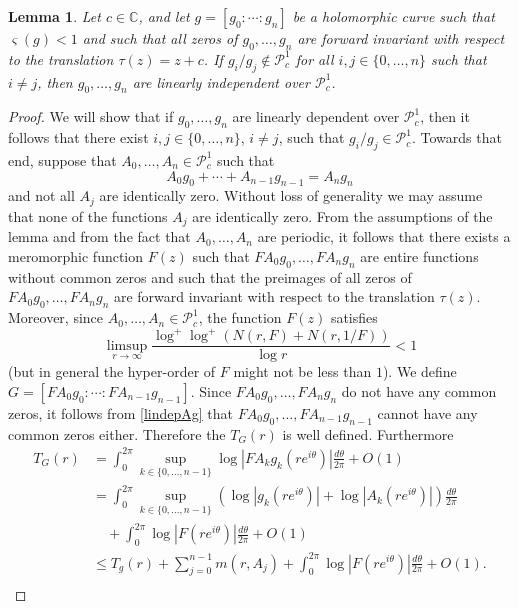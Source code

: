 \documentclass{amsart}
\newcommand{\C}{\mathbb{C}}
\newtheorem{lemma}[theorem]{Lemma}
\theoremstyle{definition}
\numberwithin{equation}{section}
\numberwithin{theorem}{section}
\begin{document}
\begin{lemma}\label{linindepP}
Let $c\in\C$, and let $g=[g_0:\cdots:g_n]$ be a holomorphic curve such that $\varsigma(g)<1$ and such that all zeros of $g_0,\ldots,g_n$ are forward invariant with respect to the translation $\tau(z)=z+c$. If $g_i/g_j\not\in \mathcal{P}^1_c$ for all $i,j\in\{0,\ldots,n\}$ such that $i\not=j$, then $g_0,\ldots,g_n$ are linearly independent over $\mathcal{P}^1_c$.
\end{lemma}

\begin{proof}
We will show that if $g_0,\ldots,g_n$ are linearly dependent over $\mathcal{P}^1_c$, then it follows that there exist $i,j\in\{0,\ldots,n\}$, $i\not=j$, such that $g_i/g_j\in \mathcal{P}^1_c$. Towards that end, suppose that $A_0,\ldots,A_n\in\mathcal{P}^1_c$ such that
	\begin{equation}\label{lindepAg}
	A_0g_0+\cdots + A_{n-1}g_{n-1}=A_n g_n
	\end{equation}
and not all $A_j$ are identically zero. Without loss of generality we may assume that none of the functions $A_j$ are identically zero. From the assumptions of the lemma and from the fact that $A_0,\ldots,A_n$ are periodic, it follows that there exists a meromorphic function $F(z)$ such that $FA_0g_0,\ldots,FA_ng_n$ are entire functions without common zeros and such that the preimages of all zeros of $FA_0g_0,\ldots,FA_ng_n$ are forward invariant with respect to the translation $\tau(z)$. Moreover, since $A_0,\ldots,A_n\in\mathcal{P}^1_c$, the function $F(z)$ satisfies
	\begin{equation}\label{NH1H}
	\limsup_{r\to\infty}\frac{\log^+\log^+ \left(N(r,F)+N(r,1/F)\right)}{\log r}<1
	\end{equation}
(but in general the hyper-order of $F$ might not be less than $1$). We define $G=[FA_0g_0:\cdots :FA_{n-1}g_{n-1}]$. Since $FA_0g_0,\ldots,FA_ng_n$ do not have any common zeros, it follows from \eqref{lindepAg} that $FA_0g_0,\ldots,FA_{n-1}g_{n-1}$ cannot have any common zeros either. Therefore the $T_G(r)$ is well defined. Furthermore
	\begin{equation}\label{TGtg}
	\begin{split}
	T_G(r)&=\int_0^{2\pi}\sup_{k\in \{0,\ldots,n-1\}} \log|FA_kg_k(re^{i\theta})|\frac{d\theta}{2\pi}+O(1)\\ &= \int_0^{2\pi}\sup_{k\in \{0,\ldots,n-1\}} (\log|g_k(re^{i\theta})|+\log|A_k(re^{i\theta})|)\frac{d\theta}{2\pi}\\&\quad+\int_0^{2\pi}\log|F(re^{i\theta})|\frac{d\theta}{2\pi}+O(1)\\ &\leq T_g(r)+\sum_{j=0}^{n-1} m(r,A_j) +\int_0^{2\pi}\log|F(re^{i\theta})|\frac{d\theta}{2\pi}+O(1).\\

\end{split}
\end{equation}
\end{proof}
\end{document}
